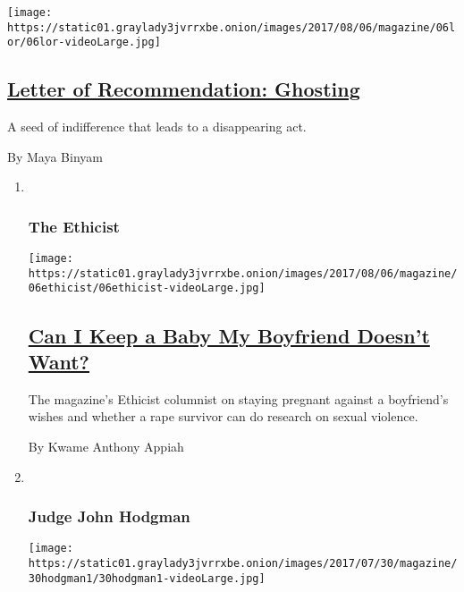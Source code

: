 \begin{enumerate}
  \texttt{[image: https://static01.graylady3jvrrxbe.onion/images/2017/08/06/magazine/06lor/06lor-videoLarge.jpg]}

  \hypertarget{letter-of-recommendation-ghosting}{%
  \subsection{\texorpdfstring{\href{/2017/08/03/magazine/letter-of-recommendation-ghosting.html}{Letter
  of Recommendation:
  Ghosting}}{Letter of Recommendation: Ghosting}}\label{letter-of-recommendation-ghosting}}

  A seed of indifference that leads to a disappearing act.

  By Maya Binyam
\end{enumerate}

\begin{enumerate}
\def\labelenumi{\arabic{enumi}.}
\item ~
  \hypertarget{the-ethicist}{%
  \subsubsection{The Ethicist}\label{the-ethicist}}

  \texttt{[image: https://static01.graylady3jvrrxbe.onion/images/2017/08/06/magazine/06ethicist/06ethicist-videoLarge.jpg]}

  \hypertarget{can-i-keep-a-baby-my-boyfriend-doesnt-want}{%
  \subsection{\texorpdfstring{\href{/2017/08/02/magazine/can-i-keep-a-baby-my-boyfriend-doesnt-want.html}{Can
  I Keep a Baby My Boyfriend Doesn't
  Want?}}{Can I Keep a Baby My Boyfriend Doesn't Want?}}\label{can-i-keep-a-baby-my-boyfriend-doesnt-want}}

  The magazine's Ethicist columnist on staying pregnant against a
  boyfriend's wishes and whether a rape survivor can do research on
  sexual violence.

  By Kwame Anthony Appiah
\item ~
  \hypertarget{judge-john-hodgman}{%
  \subsubsection{Judge John Hodgman}\label{judge-john-hodgman}}

  \texttt{[image: https://static01.graylady3jvrrxbe.onion/images/2017/07/30/magazine/30hodgman1/30hodgman1-videoLarge.jpg]}


\end{enumerate}
